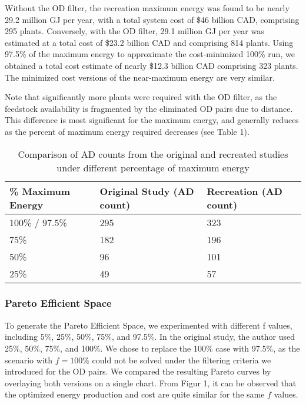 \documentclass[12pt]{article}
\begin{document}
Without the OD filter, the recreation maximum energy was found to be nearly 29.2 million GJ per year, with a total system cost of \$46 billion CAD, comprising 295 plants. Conversely, with the OD filter, 29.1 million GJ per year was estimated at a total cost of \$23.2 billion CAD and comprising 814 plants. Using 97.5\% of the maximum energy to approximate the cost-minimized 100\% run, we obtained a total cost estimate of nearly \$12.3 billion CAD comprising 323 plants. The minimized cost versions of the near-maximum energy are very similar.

Note that significantly more plants were required with the OD filter, as the feedstock availability is fragmented by the eliminated OD pairs due to distance. This difference is most significant for the maximum energy, and generally reduces as the percent of maximum energy required decreases (see Table 1).

\begin{table}[h]
  \centering
  \begin{tabular}{|p{4cm} | p{5cm} | p{5cm}|}
  \hline
  \rowcolor{gray!30}
  \% Maximum Energy & Original Study (AD count) & Recreation (AD count) \\ \hline
  100\% / 97.5\% & 295 & 323 \\ \hline
  75\% & 182 & 196 \\ \hline
  50\% & 96 & 101 \\ \hline
  25\% & 49 & 57 \\ \hline
  \end{tabular}
  \caption{Comparison of AD counts from the original and recreated studies under different percentage of maximum energy}
  \label{tab:adplants_energy}
\end{table}

\subsubsection{Pareto Efficient Space}

To generate the Pareto Efficient Space, we experimented with different f values, including 5\%, 25\%, 50\%, 75\%, and 97.5\%. In the original study, the author used 25\%, 50\%, 75\%, and 100\%. We chose to replace the 100\% case with 97.5\%, as the scenario with $f = 100\%$ could not be solved under the filtering criteria we introduced for the OD pairs. We compared the resulting Pareto curves by overlaying both versions on a single chart. From Figur 1, it can be observed that the optimized energy production and cost are quite similar for the same $f$ values.
\end{document}
